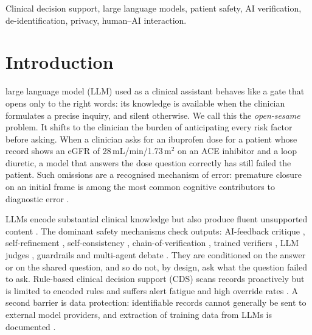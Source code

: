\documentclass[journal]{IEEEtran}
\begin{document}
\begin{IEEEkeywords}
Clinical decision support, large language models, patient safety, AI verification, de-identification, privacy, human--AI interaction.
\end{IEEEkeywords}

\section{Introduction}
 large language model (LLM) used as a clinical assistant behaves like a gate that opens only to the right words: its knowledge is available when the clinician formulates a precise inquiry, and silent otherwise. We call this the \emph{open-sesame} problem. It shifts to the clinician the burden of anticipating every risk factor before asking. When a clinician asks for an ibuprofen dose for a patient whose record shows an eGFR of 28\,mL/min/1.73\,m$^2$ on an ACE inhibitor and a loop diuretic, a model that answers the dose question correctly has still failed the patient. Such omissions are a recognised mechanism of error: premature closure on an initial frame is among the most common cognitive contributors to diagnostic error \cite{graber2005}.

LLMs encode substantial clinical knowledge \cite{singhal2023,singhal2025,nori2023} but also produce fluent unsupported content \cite{pal2023}. The dominant safety mechanisms check outputs: AI-feedback critique \cite{bai2022}, self-refinement \cite{madaan2023,shinn2023}, self-consistency \cite{wang2023}, chain-of-verification \cite{dhuliawala2024}, trained verifiers \cite{cobbe2021,lightman2024}, LLM judges \cite{zheng2023}, guardrails \cite{inan2023,rebedea2023} and multi-agent debate \cite{du2024,irving2018}. They are conditioned on the answer or on the shared question, and so do not, by design, ask what the question failed to ask. Rule-based clinical decision support (CDS) scans records proactively \cite{bates2003,sutton2020} but is limited to encoded rules and suffers alert fatigue and high override rates \cite{vandersijs2006,ancker2017}. A second barrier is data protection: identifiable records cannot generally be sent to external model providers, and extraction of training data from LLMs is documented \cite{carlini2021}.
\end{document}
